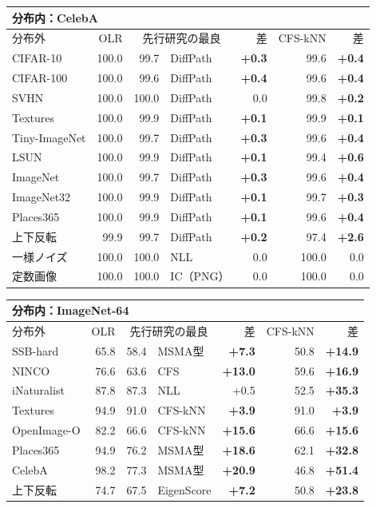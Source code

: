\documentclass[border=3pt]{standalone}
\newcommand{\B}[1]{\textcolor{tnavy}{\textbf{#1}}}
\begin{document}
%
\begin{tabular}[t]{lrrlrrr}
\toprule
\multicolumn{7}{l}{分布内：CelebA}\\
\midrule
分布外 & OLR & \multicolumn{2}{c}{先行研究の最良} & 差 & CFS-kNN & 差\\
\midrule
CIFAR-10 & 100.0 & 99.7 & DiffPath & \B{+0.3} & 99.6 & \B{+0.4}\\
CIFAR-100 & 100.0 & 99.6 & DiffPath & \B{+0.4} & 99.6 & \B{+0.4}\\
SVHN & 100.0 & 100.0 & DiffPath & 0.0 & 99.8 & \B{+0.2}\\
Textures & 100.0 & 99.9 & DiffPath & \B{+0.1} & 99.9 & \B{+0.1}\\
Tiny-ImageNet & 100.0 & 99.7 & DiffPath & \B{+0.3} & 99.6 & \B{+0.4}\\
LSUN & 100.0 & 99.9 & DiffPath & \B{+0.1} & 99.4 & \B{+0.6}\\
ImageNet & 100.0 & 99.7 & DiffPath & \B{+0.3} & 99.6 & \B{+0.4}\\
ImageNet32 & 100.0 & 99.9 & DiffPath & \B{+0.1} & 99.7 & \B{+0.3}\\
Places365 & 100.0 & 99.9 & DiffPath & \B{+0.1} & 99.6 & \B{+0.4}\\
上下反転 & 99.9 & 99.7 & DiffPath & \B{+0.2} & 97.4 & \B{+2.6}\\
一様ノイズ & 100.0 & 100.0 & NLL & 0.0 & 100.0 & 0.0\\
定数画像 & 100.0 & 100.0 & IC（PNG） & 0.0 & 100.0 & 0.0\\
\bottomrule
\end{tabular}%
\hspace{14pt}%
\begin{tabular}[t]{lrrlrrr}
\toprule
\multicolumn{7}{l}{分布内：ImageNet-64}\\
\midrule
分布外 & OLR & \multicolumn{2}{c}{先行研究の最良} & 差 & CFS-kNN & 差\\
\midrule
SSB-hard & 65.8 & 58.4 & MSMA型 & \B{+7.3} & 50.8 & \B{+14.9}\\
NINCO & 76.6 & 63.6 & CFS & \B{+13.0} & 59.6 & \B{+16.9}\\
iNaturalist & 87.8 & 87.3 & NLL & +0.5 & 52.5 & \B{+35.3}\\
Textures & 94.9 & 91.0 & CFS-kNN & \B{+3.9} & 91.0 & \B{+3.9}\\
OpenImage-O & 82.2 & 66.6 & CFS-kNN & \B{+15.6} & 66.6 & \B{+15.6}\\
Places365 & 94.9 & 76.2 & MSMA型 & \B{+18.6} & 62.1 & \B{+32.8}\\
CelebA & 98.2 & 77.3 & MSMA型 & \B{+20.9} & 46.8 & \B{+51.4}\\
上下反転 & 74.7 & 67.5 & EigenScore & \B{+7.2} & 50.8 & \B{+23.8}\\
\bottomrule
\end{tabular}%
\end{document}
